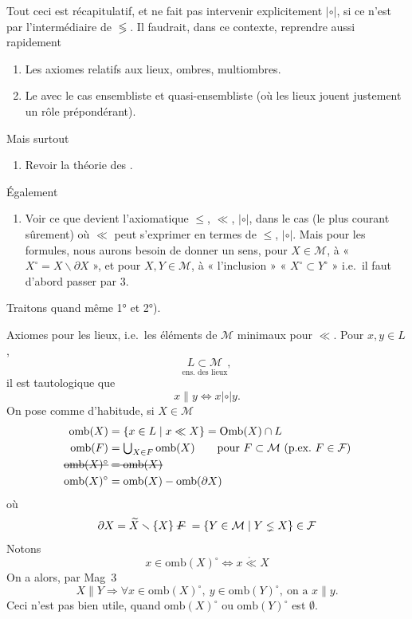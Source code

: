 \documentclass[11pt,a4paper]{article}
\begin{document}
Tout ceci est récapitulatif, et ne fait pas intervenir explicitement $|\circ|$, si ce n'est par l'intermédiaire de $\lessgtr$. Il faudrait, dans ce contexte, reprendre aussi rapidement 
\begin{enumerate}
  \item[1)] Les axiomes relatifs aux lieux, ombres, multiombres.
  \item[2)] Le  avec le cas ensembliste et quasi-ensembliste (où les lieux jouent justement un rôle prépondérant).
\end{enumerate}
Mais surtout
\begin{enumerate}
  \item[3)] Revoir la théorie des .
\end{enumerate}
 Également
\begin{enumerate}
  \item[4)] Voir ce que devient l'axiomatique $\leq$, $\ll$, $|\circ|$, dans le cas (le plus courant sûrement) où $\ll$ peut s'exprimer en termes de $\leq$, $|\circ|$. Mais pour les formules, nous aurons besoin de donner un sens, pour $X \in \mathcal{M}$, à
  « $X^{\circ} = X \smallsetminus \partial X$ »,
  et pour $X, Y \in \mathcal{M}$, à « l'inclusion »
  « $X^{\circ} \subset Y^{\circ}$ »
  i.e.\ il faut d'abord passer par 3.
\end{enumerate}
Traitons quand même 1° et 2°).


Axiomes pour les lieux, i.e.\ les éléments de $\mathcal{M}$ minimaux pour $\ll$. Pour $x, y \in L$,
\[
  \underset{\text{ens.\ des lieux}}{L \subset \mathcal{M}},
\]
il est tautologique que
\[
  x \parallel y \Longleftrightarrow x |\circ| y .
\]
  On pose comme d'habitude, si $X \in \mathcal{M}$
\[
\begin{aligned}
  \mathrm{omb}(X) &= \{ x \in L \mid x \ll X \} = \mathrm{Omb}(X) \cap L \\
  \mathrm{omb}(F) &= \textstyle\bigcup_{X \in F} \mathrm{omb}(X) \qquad \text{pour } F \subset \mathcal{M} \text{ (p.ex.\ } F \in \mathcal{F}) \\
  \text{\struck{$\mathrm{omb}(X)^{\circ}$}} &\;\text{\struck{$= \mathrm{omb}(X)$}} \\
  \mathrm{omb}(X)^{\circ} &= \mathrm{omb}(X) - \mathrm{omb}(\partial X)
\end{aligned}
\]
où
\[
  \partial X = \widetilde{X} \smallsetminus \{X\} \;\text{\struck{$F$}}\; = \{ Y \in \mathcal{M} \mid Y \lneq X \} \in \mathcal{F}
\]
Notons
\[
  x \in \mathrm{omb}(X)^{\circ} \Longleftrightarrow x \mathring{\ll} X
\]
On a alors, par Mag~3
\[
  X \parallel Y \Longrightarrow \forall x \in \mathrm{omb}(X)^{\circ},\ y \in \mathrm{omb}(Y)^{\circ},\ \text{on a } x \parallel y .
\]
Ceci n'est pas bien utile, quand $\mathrm{omb}(X)^{\circ}$ ou $\mathrm{omb}(Y)^{\circ}$ est $\emptyset$.
\end{document}
